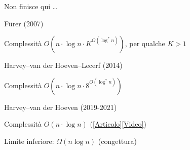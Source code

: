 \begin{frame}{Non finisce qui \ldots}

\vspace{-15pt}
\BI
\item \alert{Fürer} (2007)
  \BI
  \item Complessità $O(n \cdot \log n \cdot K^{O(\log^* n)})$, per qualche $K>1$
  \EI
\item \alert{Harvey--van der Hoeven--Lecerf} (2014)
  \BI
  \item Complessità $O(n \cdot \log n \cdot 8^{O(\log^* n)})$
  \EI
\item \alert{Harvey--van der Hoeven} (2019-2021)
  \BI
  \item Complessità $O(n \cdot \log n)$ (\href{https://hal.archives-ouvertes.fr/hal-02070778/document}{[Articolo]}\href{https://www.youtube.com/watch?v=FKGRc867j10&ab_channel=MathsStatsUNSW}{[Video]})
  \EI
\item Limite inferiore: $\Omega(n \log n)$ (congettura)
\EI

\end{frame}

